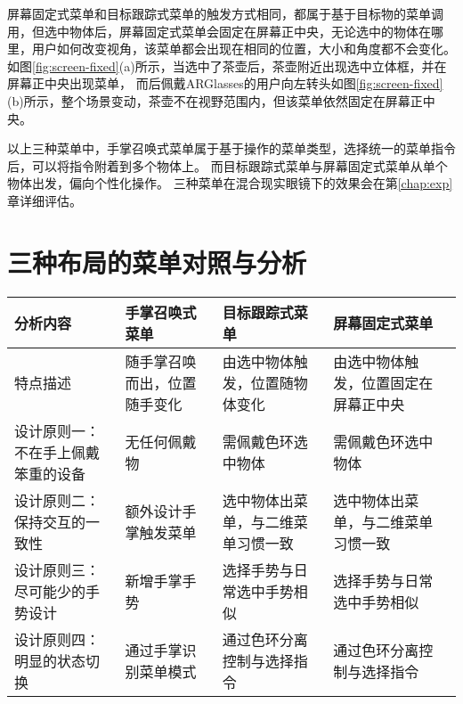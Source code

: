 屏幕固定式菜单和目标跟踪式菜单的触发方式相同，都属于基于目标物的菜单调用，但选中物体后，屏幕固定式菜单会固定在屏幕正中央，无论选中的物体在哪里，用户如何改变视角，该菜单都会出现在相同的位置，大小和角度都不会变化。
如图\ref{fig:screen-fixed}(a)所示，当选中了茶壶后，茶壶附近出现选中立体框，并在屏幕正中央出现菜单，
而后佩戴ARGlasses的用户向左转头如图\ref{fig:screen-fixed}(b)所示，整个场景变动，茶壶不在视野范围内，但该菜单依然固定在屏幕正中央。

以上三种菜单中，手掌召唤式菜单属于基于操作的菜单类型，选择统一的菜单指令后，可以将指令附着到多个物体上。
而目标跟踪式菜单与屏幕固定式菜单从单个物体出发，偏向个性化操作。
三种菜单在混合现实眼镜下的效果会在第\ref{chap:exp}章详细评估。

\section{三种布局的菜单对照与分析}

\begin{table}[!hpbt]\renewcommand{\arraystretch}{1.1}
  \centering
\begin{tabular}{*{4}{L{.23\textwidth}}} \toprule
    分析内容 & 手掌召唤式菜单 & 目标跟踪式菜单 & 屏幕固定式菜单 \\
	\midrule
    特点描述 	&
	随手掌召唤而出，位置随手变化 		&
 	由选中物体触发，位置随物体变化 &
	\hspace{100pt}由选中物体触发，位置固定在屏幕正中央\\	
	设计原则一：\hspace{15pt}不在手上佩戴笨重的设备 &
	无任何佩戴物 &
	需佩戴色环选中物体 &
	需佩戴色环选中物体 &\\
	设计原则二：\hspace{15pt}保持交互的一致性 &
	额外设计手掌触发菜单 &
	选中物体出菜单，与二维菜单习惯一致 &
	选中物体出菜单，与二维菜单习惯一致 &\\
	设计原则三：\hspace{15pt}尽可能少的手势设计&
	新增手掌手势&
	选择手势与日常选中手势相似&
	选择手势与日常选中手势相似&\\
	设计原则四：\hspace{15pt}明显的状态切换&
	通过手掌识别菜单模式&
	通过色环分离控制与选择指令&
	通过色环分离控制与选择指令&
	\bottomrule
  \end{tabular}
\end{table}

